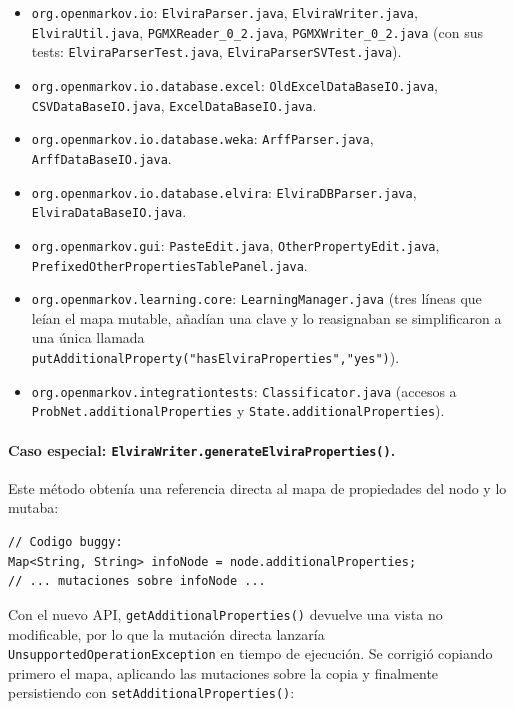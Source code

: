 \documentclass[11pt,a4paper]{article}
\newcommand{\code}[1]{\texttt{#1}}
\newcommand{\file}[1]{\texttt{#1}}
\begin{document}
\begin{itemize}
  \item \code{org.openmarkov.io}: \file{ElviraParser.java},
    \file{ElviraWriter.java}, \file{ElviraUtil.java},
    \file{PGMXReader\_0\_2.java}, \file{PGMXWriter\_0\_2.java}
    (con sus tests: \file{ElviraParserTest.java},
    \file{ElviraParserSVTest.java}).

  \item \code{org.openmarkov.io.database.excel}:
    \file{OldExcelDataBaseIO.java}, \file{CSVDataBaseIO.java},
    \file{ExcelDataBaseIO.java}.

  \item \code{org.openmarkov.io.database.weka}:
    \file{ArffParser.java}, \file{ArffDataBaseIO.java}.

  \item \code{org.openmarkov.io.database.elvira}:
    \file{ElviraDBParser.java}, \file{ElviraDataBaseIO.java}.

  \item \code{org.openmarkov.gui}:
    \file{PasteEdit.java}, \file{OtherPropertyEdit.java},
    \file{PrefixedOtherPropertiesTablePanel.java}.

  \item \code{org.openmarkov.learning.core}:
    \file{LearningManager.java} (tres líneas que leían el mapa
    mutable, añadían una clave y lo reasignaban se simplificaron
    a una única llamada \code{putAdditionalProperty("hasElviraProperties","yes")}).

  \item \code{org.openmarkov.integrationtests}:
    \file{Classificator.java} (accesos a
    \code{ProbNet.additionalProperties} y \code{State.additionalProperties}).
\end{itemize}

\paragraph{Caso especial: \code{ElviraWriter.generateElviraProperties()}.}

Este método obtenía una referencia directa al mapa de propiedades del nodo
y lo mutaba:

\begin{lstlisting}
// Codigo buggy:
Map<String, String> infoNode = node.additionalProperties;
// ... mutaciones sobre infoNode ...
\end{lstlisting}

Con el nuevo API, \code{getAdditionalProperties()} devuelve una vista no
modificable, por lo que la mutación directa lanzaría
\code{UnsupportedOperationException} en tiempo de ejecución. Se corrigió
copiando primero el mapa, aplicando las mutaciones sobre la copia y
finalmente persistiendo con \code{setAdditionalProperties()}:
\end{document}
